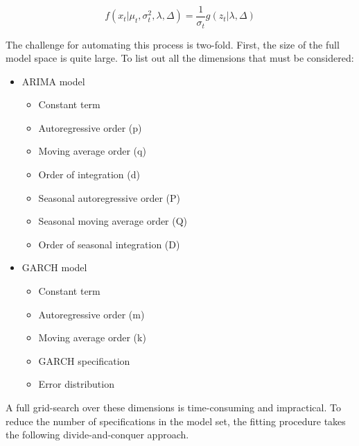 \documentclass[12pt]{report}
\begin{document}
\begin{equation} \label{eq:conditional_distr}
    f(x_{t} | \mu_{t}, \sigma^{2}_{t}, \lambda, \Delta) = \frac{1}{\sigma_{t}} g(z_{t} | \lambda, \Delta)
\end{equation}

The challenge for automating this process is two-fold. First, the size of the full model space is quite large. To list out all the dimensions that must be considered:

\begin{itemize}
    \item ARIMA model
        \begin{itemize}
            \item Constant term
            \item Autoregressive order (p)
            \item Moving average order (q)
            \item Order of integration (d)
            \item Seasonal autoregressive order (P)
            \item Seasonal moving average order (Q)
            \item Order of seasonal integration (D)
        \end{itemize}
        \item GARCH model
        \begin{itemize}
            \item Constant term
            \item Autoregressive order (m)
            \item Moving average order (k)
            \item GARCH specification
            \item Error distribution
        \end{itemize}

\end{itemize}

A full grid-search over these dimensions is time-consuming and impractical. To reduce the number of specifications in the model set, the fitting procedure takes the following divide-and-conquer approach.
\end{document}
